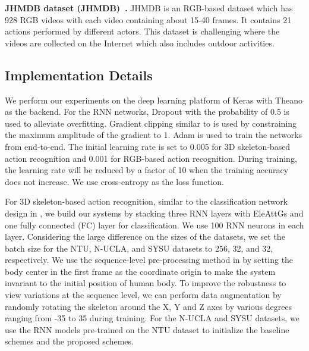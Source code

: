 \documentclass[runningheads]{llncs}
\newcommand{\EleAttGn}{{EleAttG}}
\begin{document}
\textbf{JHMDB dataset (JHMDB)~\cite{jhuang2013towards}.} JHMDB is an RGB-based dataset which has 928 RGB videos with each video containing about 15-40 frames. It contains 21 actions performed by different actors. This dataset is challenging where the videos are collected on the Internet which also includes outdoor activities.

\subsection{Implementation Details}
\label{subsec:implement}

We perform our experiments on the deep learning platform of Keras \cite{chollet2015keras} with Theano \cite{al2016theano} as the backend. For the RNN networks, Dropout \cite{srivastava2014dropout} with the probability of 0.5 is used to alleviate overfitting. Gradient clipping similar to \cite{sutskever2014sequence} is used by constraining the maximum amplitude of the gradient to 1. Adam \cite{kingma2014adam} is used to train the networks from end-to-end. The initial learning rate is set to 0.005 for 3D skeleton-based action recognition and 0.001 for RGB-based action recognition. During training, the learning rate will be reduced by a factor of 10 when the training accuracy does not increase. We use cross-entropy as the loss function. 

For 3D skeleton-based action recognition, similar to the classification network design in \cite{zhang2017view}, we build our systems by stacking three RNN layers with {\EleAttGn}s and one fully connected (FC) layer for classification. We use 100 RNN neurons in each layer. Considering the large difference on the sizes of the datasets, we set the batch size for the NTU, N-UCLA, and SYSU datasets to 256, 32, and 32, respectively. We use the sequence-level pre-processing method in \cite{zhang2017view} by setting the body center in the first frame as the coordinate origin to make the system invariant to the initial position of human body. To improve the robustness to view variations at the sequence level, we can perform data augmentation by randomly rotating the skeleton around the X, Y and Z axes by various degrees ranging from -35 to 35 during training. For the N-UCLA and SYSU datasets, we use the RNN models pre-trained on the NTU dataset to initialize the baseline schemes and the proposed schemes.   
\end{document}
